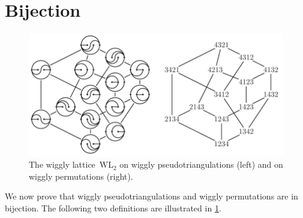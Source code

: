 \documentclass[submission]{FPSAC2025}
\theoremstyle{definition}
\newcommand{\wigglyLattice}{\mathrm{WL}} %
\begin{document}

\newpage
\section{Bijection}
\label{sec:bijection}

\begin{figure}[t]
\centerline{\includegraphics[scale=1.1]{wigglyLattice}}
\caption{The wiggly lattice~$\wigglyLattice_2$ on wiggly pseudotriangulations (left) and on wiggly permutations (right).}
\label{fig:wigglyLattice}
\end{figure}

We now prove that wiggly pseudotriangulations and wiggly permutations are in bijection.
The following two definitions are illustrated in \cref{fig:wigglyLattice}.
\end{document}
